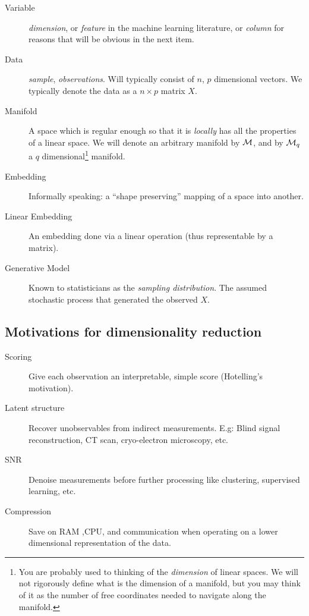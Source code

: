 \documentclass[12pt,a4paper]{article}
\begin{document}
\begin{tcolorbox}
	\begin{description}
		
		\item[Variable] \Aka \emph{dimension}, or \emph{feature} in the machine learning literature, or \emph{column} for reasons that will be obvious in the next item. 
		
		\item[Data] \Aka \emph{sample}, \emph{observations}. 
		Will typically consist of $n$, $p$ dimensional vectors.
		We typically denote the data as a $n\times p$ matrix $X$. 
		
		\item[Manifold] A space which is regular enough so that it is \emph{locally} has all the properties of a linear space. 
		We will denote an arbitrary manifold by $\mathcal{M}$, and by $\mathcal{M}_q$ a $q$ dimensional\footnote{You are probably used to thinking of the \emph{dimension} of linear spaces. We will not rigorously define what is the dimension of a manifold, but you may think of it as the number of free coordinates needed to navigate along the manifold.} manifold.
		
		
		\item[Embedding] Informally speaking: a ``shape preserving'' mapping of a space into another. 
		
		\item[Linear Embedding] An embedding done via a linear operation (thus representable by a matrix). 
		
		\item[Generative Model] Known to statisticians as the \emph{sampling distribution}. 
		The assumed stochastic process that generated the observed $X$. 
		
	\end{description}
\end{tcolorbox}




\subsection{Motivations for dimensionality reduction}

\begin{description}
	\item [Scoring] Give each observation an interpretable, simple score (Hotelling's motivation).

	\item [Latent structure] Recover unobservables from indirect measurements. 
	E.g: Blind signal reconstruction, CT scan, cryo-electron microscopy, etc. 
	
	\item [SNR] Denoise measurements before further processing like clustering, supervised learning, etc. 
	
	\item [Compression] Save on RAM ,CPU, and communication when operating on a lower dimensional representation of the data. 
	
\end{description}
\end{document}
